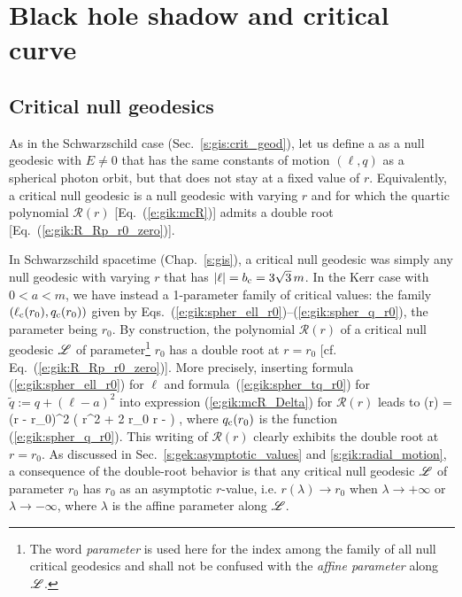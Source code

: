 
\section{Black hole shadow and critical curve} \label{s:gik:shadow}

\subsection{Critical null geodesics} \label{s:gik:critical_geod}

As in the Schwarzschild case (Sec.~\ref{s:gis:crit_geod}), let us define
a 
as a null geodesic with $E\neq 0$ that has the same constants of motion
$(\ell,q)$ as a spherical photon orbit, but that does not stay at a fixed value
of $r$. Equivalently, a critical null geodesic
is a null geodesic with varying $r$ and for which the quartic polynomial $\mathcal{R}(r)$
[Eq.~(\ref{e:gik:mcR})] admits a double root [Eq.~(\ref{e:gik:R_Rp_r0_zero})].

In Schwarzschild spacetime (Chap.~\ref{s:gis}),
a critical null geodesic was simply any null geodesic with varying $r$
that has $|\ell| = b_{\rm c} = 3\sqrt{3}\, m$.
In the Kerr case with $0 < a < m$, we have instead a 1-parameter family of critical values:
the family $(\ell_{\rm c}(r_0),q_{\rm c}(r_0))$ given by Eqs.~(\ref{e:gik:spher_ell_r0})--(\ref{e:gik:spher_q_r0}), the
parameter being $r_0$. By construction, the polynomial $\mathcal{R}(r)$
of a critical null geodesic $\mathscr{L}$ of parameter\footnote{The word \emph{parameter} is
used here for the index among the family of all null critical geodesics and shall
not be confused with the \emph{affine parameter} along $\mathscr{L}$.} $r_0$ has a double root at $r=r_0$
[cf. Eq.~(\ref{e:gik:R_Rp_r0_zero})]. More precisely, inserting formula
(\ref{e:gik:spher_ell_r0}) for $\ell$ and formula~(\ref{e:gik:spher_tq_r0})
for $\tilde{q} := q + (\ell - a)^2$
into expression (\ref{e:gik:mcR_Delta}) for $\mathcal{R}(r)$ leads to
\be \label{e:gik:mR_critical_null}
    (r) = (r - r_0)^2 \left( r^2 + 2 r_0 r -  \right) ,
\ee
where $q_{\rm c}(r_0)$ is the function (\ref{e:gik:spher_q_r0}).
This writing of $\mathcal{R}(r)$ clearly exhibits the double root at $r=r_0$.
As discussed in Sec.~\ref{s:gek:asymptotic_values} and \ref{s:gik:radial_motion},
a consequence of the double-root behavior is that
any critical null geodesic $\mathscr{L}$ of parameter $r_0$ has
$r_0$ as an asymptotic $r$-value, i.e. $r(\lambda)\to r_0$
when $\lambda\to+\infty$ or $\lambda\to-\infty$, where $\lambda$ is the affine
parameter along $\mathscr{L}$.

